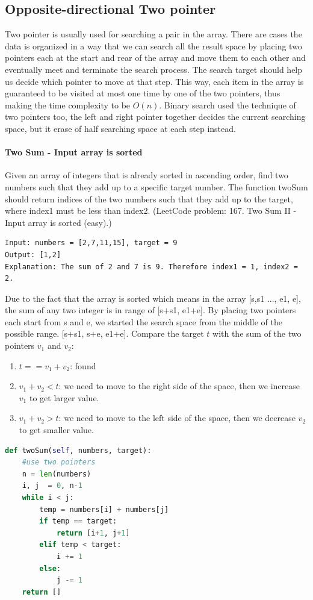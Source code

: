 \documentclass[../searching.tex]{subfiles}
\begin{document}
\subsection{Opposite-directional Two pointer}
Two pointer is usually used for searching a pair in the array. There are cases the data is organized in a way that we can search all the result space by placing two pointers each at the start and rear of the array and move them to each other and eventually meet and terminate the search process. The search target should help us decide which pointer to move at that step.  This way, each item in the array is guaranteed to be visited at most one time by one of the two pointers, thus making the time complexity to be $O(n)$. Binary search used the technique of two pointers too, the left and right pointer together decides the current searching space, but it erase of half searching space at each step instead.

\paragraph{Two Sum - Input array is sorted} Given an array of integers that is already sorted in ascending order, find two numbers such that they add up to a specific target number. The function twoSum should return indices of the two numbers such that they add up to the target, where index1 must be less than index2.  (LeetCode problem: 167. Two Sum II - Input array is sorted (easy).)
\begin{lstlisting}[numbers=none]
Input: numbers = [2,7,11,15], target = 9
Output: [1,2]
Explanation: The sum of 2 and 7 is 9. Therefore index1 = 1, index2 = 2.
\end{lstlisting}

Due to the fact that the array is sorted which means in the array [s,s1 ..., e1, e], the sum of any two integer is in range of [s+s1, e1+e]. By placing two pointers each start from s and e, we started the search space from the middle of the possible range. [s+s1, s+e, e1+e].  Compare the target $t$ with the sum of the two pointers $v_1$ and $v_2$:
\begin{enumerate}
    \item  $t == v_1 + v_2$: found
    \item  $v_1+v_2 < t$: we need to move to the right side of the space, then we increase $v_1$ to get larger value.
    \item $v_1+v_2 > t$: we need to move to the left side of the space, then we decrease $v_2$ to get smaller value.
\end{enumerate}
\begin{lstlisting}[language=Python]
def twoSum(self, numbers, target):
    #use two pointers
    n = len(numbers)
    i, j  = 0, n-1
    while i < j:
        temp = numbers[i] + numbers[j]
        if temp == target:
            return [i+1, j+1]
        elif temp < target:
            i += 1
        else:
            j -= 1
    return []
\end{lstlisting}
\end{document}
